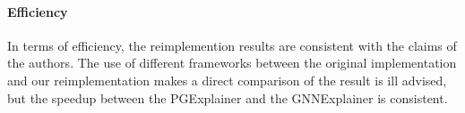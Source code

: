 \paragraph{Efficiency}
In terms of efficiency, the reimplemention results are consistent with the claims of the authors. The use of different frameworks between the original implementation and our reimplementation makes a direct comparison of the result is ill advised, but the speedup between the PGExplainer and the GNNExplainer is consistent.
